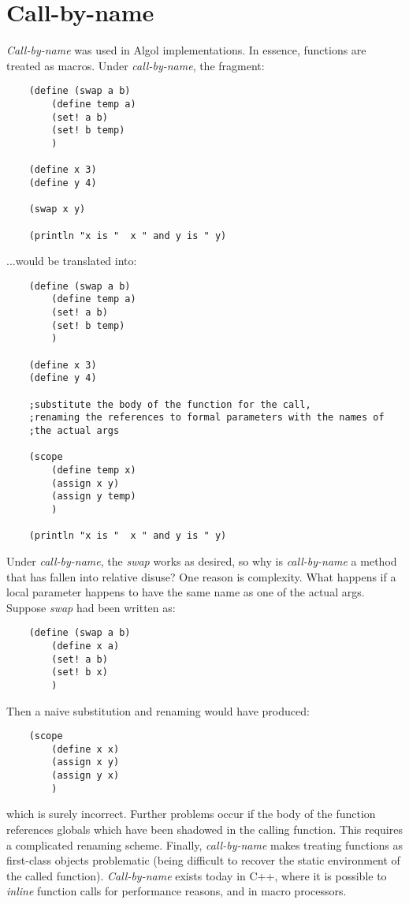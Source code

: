 \section*{Call-by-name}

{\it Call-by-name} was used in Algol implementations. In essence, functions
are treated as macros. Under {\it call-by-name}, the fragment:

\begin{verbatim}
    (define (swap a b)
        (define temp a)
        (set! a b)
        (set! b temp)
        )

    (define x 3)
    (define y 4)

    (swap x y)

    (println "x is "  x " and y is " y)
\end{verbatim}

...would be translated into:

\begin{verbatim}
    (define (swap a b)
        (define temp a)
        (set! a b)
        (set! b temp)
        )

    (define x 3)
    (define y 4)

    ;substitute the body of the function for the call, 
    ;renaming the references to formal parameters with the names of 
    ;the actual args

    (scope
        (define temp x)
        (assign x y)
        (assign y temp)
        )

    (println "x is "  x " and y is " y)
\end{verbatim}

Under {\it call-by-name}, the {\it swap} works as desired,
so why is {\it call-by-name}
a method that has fallen into relative disuse? One reason is complexity.
What happens if a local parameter happens to have the same name as one of
the actual args. Suppose {\it swap} had been written as:

\begin{verbatim}
    (define (swap a b)
        (define x a) 
        (set! a b)
        (set! b x)
        )
\end{verbatim}

Then a naive substitution and renaming would have produced:

\begin{verbatim}
    (scope
        (define x x)
        (assign x y)
        (assign y x)
        )
\end{verbatim}

which is surely incorrect.
Further problems occur if the body of the function references
globals which have been shadowed in the calling function. This requires
a complicated renaming scheme. Finally, {\it call-by-name} makes treating
functions as first-class objects problematic (being difficult to recover
the static environment of the called function). {\it Call-by-name}
exists today in C++, where it is possible to {\it inline} function calls
for performance reasons, and in macro processors.

